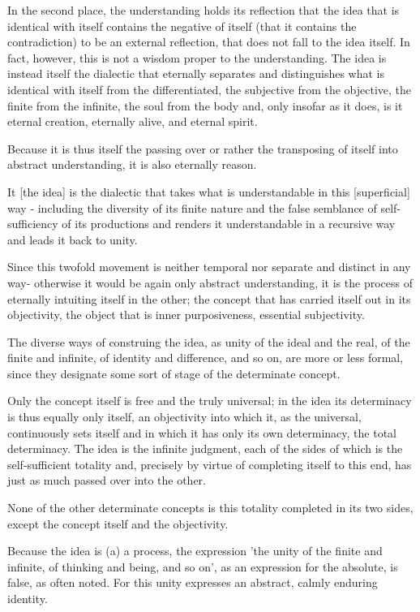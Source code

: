 In the second place, the understanding holds its reflection that
the idea that is identical with itself contains the negative of itself
(that it contains the contradiction) to be an external reflection,
that does not fall to the idea itself.
In fact, however, this is not a wisdom proper to the understanding.
The idea is instead itself the dialectic that
eternally separates and distinguishes what is
identical with itself from the differentiated,
the subjective from the objective,
the finite from the infinite,
the soul from the body and,
only insofar as it does,
is it eternal creation,
eternally alive,
and eternal spirit.

Because it is thus itself the passing over or rather
the transposing of itself into abstract understanding,
it is also eternally reason.

It [the idea] is the dialectic that takes what is understandable
in this [superficial] way - including the diversity of its finite nature
and the false semblance of self-sufficiency of its productions
and renders it understandable in a recursive way
and leads it back to unity.

Since this twofold movement is neither temporal nor separate and distinct in any way-
otherwise it would be again only abstract understanding,
it is the process of eternally intuiting itself in the other;
the concept that has carried itself out in its objectivity,
the object that is inner purposiveness, essential subjectivity.

The diverse ways of construing the idea,
as unity of the ideal and the real,
of the finite and infinite,
of identity and difference,
and so on, are more or less formal,
since they designate some sort of
stage of the determinate concept.

Only the concept itself is free and the truly universal;
in the idea its determinacy is thus equally only itself,
an objectivity into which it, as the universal,
continuously sets itself and in which it has only
its own determinacy, the total determinacy.
The idea is the infinite judgment,
each of the sides of which is
the self-sufficient totality and,
precisely by virtue of completing itself to this end,
has just as much passed over into the other.

None of the other determinate concepts is
this totality completed in its two sides,
except the concept itself and the objectivity.

Because the idea is (a) a process, the expression
'the unity of the finite and infinite, of thinking and being, and so on',
as an expression for the absolute, is false, as often noted.
For this unity expresses an abstract, calmly enduring identity.

